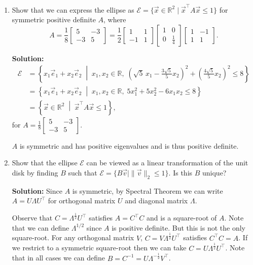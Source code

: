 \documentclass[10pt]{article}
\theoremstyle{definition}
\theoremstyle{plain}
\newcommand{\RR}{\mathbb{R}}
\begin{document}
\begin{enumerate}[label=(\alph*)]
\item Show that we can express the ellipse as $\mathcal{E} = \{\vec{x} \in \RR^2 \mid \vec{x}^\top A \vec{x} \leq 1\}$ for symmetric positive definite $A$, where
\begin{equation}
A = \frac{1}{8} \begin{bmatrix} 5 & -3 \\ -3 & 5 \end{bmatrix} = \frac{1}{2} \begin{bmatrix} 1 & 1 \\ -1 & 1 \end{bmatrix} \begin{bmatrix} 1 & 0 \\ 0 & \frac{1}{4} \end{bmatrix} \begin{bmatrix} 1 & -1 \\ 1 & 1 \end{bmatrix}.
\end{equation}

\textbf{Solution:}
\begin{align}
\mathcal{E} &= \left\{ x_1 \vec{e}_1 + x_2 \vec{e}_2 \;\middle|\; x_1, x_2 \in \RR,\; \left( \sqrt{5}\, x_1 - \frac{3\sqrt{5}}{5} x_2 \right)^2 + \left( \frac{4\sqrt{5}}{5} x_2 \right)^2 \leq 8 \right\} \\
&= \left\{ x_1 \vec{e}_1 + x_2 \vec{e}_2 \;\middle|\; x_1, x_2 \in \RR,\; 5x_1^2 + 5x_2^2 - 6x_1 x_2 \leq 8 \right\} \\
&= \left\{ \vec{x} \in \RR^2 \;\middle|\; \vec{x}^\top A \vec{x} \leq 1 \right\},
\end{align}
for $A = \frac{1}{8} \begin{bmatrix} 5 & -3 \\ -3 & 5 \end{bmatrix}$.

$A$ is symmetric and has positive eigenvalues and is thus positive definite.

\item Show that the ellipse $\mathcal{E}$ can be viewed as a linear transformation of the unit disk by finding $B$ such that $\mathcal{E} = \{B\vec{v} \mid \|\vec{v}\|_2 \leq 1\}$. Is this $B$ unique?

\textbf{Solution:} Since $A$ is symmetric, by Spectral Theorem we can write $A = U\Lambda U^\top$ for orthogonal matrix $U$ and diagonal matrix $\Lambda$.

Observe that $C = \Lambda^{\frac{1}{2}} U^\top$ satisfies $A = C^\top C$ and is a square-root of $A$. Note that we can define $\Lambda^{1/2}$ since $A$ is positive definite. But this is not the only square-root. For any orthogonal matrix $V$, $C = V\Lambda^{\frac{1}{2}} U^\top$ satisfies $C^\top C = A$. If we restrict to a symmetric square-root then we can take $C = U\Lambda^{\frac{1}{2}} U^\top$. Note that in all cases we can define $B = C^{-1} = U\Lambda^{-\frac{1}{2}} V^\top$.


\end{enumerate}
\end{document}
